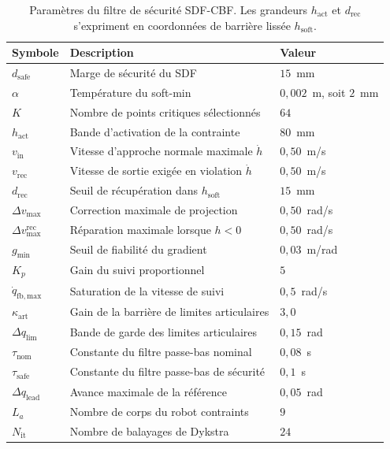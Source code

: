 \begin{table}[htpb]
\centering
\caption[Paramètres du filtre de sécurité SDF-CBF]{Paramètres du filtre de sécurité \acs{SDF}-\ac{CBF}. Les grandeurs $h_{\mathrm{act}}$ et $d_{\mathrm{rec}}$ s'expriment en coordonnées de barrière lissée $h_{\mathrm{soft}}$.}
\label{tab:cbf_params}
\small
\begin{tabular}{lll}
\hline
Symbole & Description & Valeur \\ \hline
$d_{\mathrm{safe}}$ & Marge de sécurité du \ac{SDF} & $15$~mm \\
$\alpha$ & Température du soft-min & $0{,}002$~m, soit $2$~mm \\
$K$ & Nombre de points critiques sélectionnés & $64$ \\
$h_{\mathrm{act}}$ & Bande d'activation de la contrainte & $80$~mm \\
$v_{\mathrm{in}}$ & Vitesse d'approche normale maximale $\dot{h}$ & $0{,}50$~m/s \\
$v_{\mathrm{rec}}$ & Vitesse de sortie exigée en violation $\dot{h}$ & $0{,}50$~m/s \\
$d_{\mathrm{rec}}$ & Seuil de récupération dans $h_{\mathrm{soft}}$ & $15$~mm \\
$\Delta v_{\max}$ & Correction maximale de projection & $0{,}50$~rad/s \\
$\Delta v_{\max}^{\mathrm{rec}}$ & Réparation maximale lorsque $h<0$ & $0{,}50$~rad/s \\
$g_{\min}$ & Seuil de fiabilité du gradient & $0{,}03$~m/rad \\
$K_p$ & Gain du suivi proportionnel & $5$ \\
$\dot{q}_{\mathrm{fb,max}}$ & Saturation de la vitesse de suivi & $0{,}5$~rad/s \\
$\kappa_{\mathrm{art}}$ & Gain de la barrière de limites articulaires & $3{,}0$ \\
$\Delta q_{\mathrm{lim}}$ & Bande de garde des limites articulaires & $0{,}15$~rad \\
$\tau_{\mathrm{nom}}$ & Constante du filtre passe-bas nominal & $0{,}08$~s \\
$\tau_{\mathrm{safe}}$ & Constante du filtre passe-bas de sécurité & $0{,}1$~s \\
$\Delta q_{\mathrm{lead}}$ & Avance maximale de la référence & $0{,}05$~rad \\
$L_a$ & Nombre de corps du robot contraints & $9$ \\
$N_{\mathrm{it}}$ & Nombre de balayages de Dykstra & $24$ \\

\end{tabular}
\end{table}
